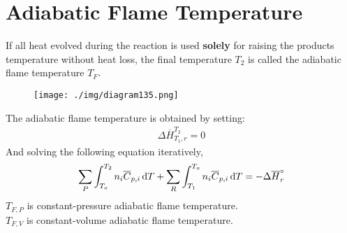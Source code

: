 \section{Adiabatic Flame Temperature}
If all heat evolved during the reaction is used \textbf{solely} for raising the products temperature without heat loss, the final temperature $T_2$ is called the adiabatic flame temperature $T_F$.
\begin{figure}[H]
  \centering
  \texttt{[image: ./img/diagram135.png]}
  \caption{}
\end{figure}
The adiabatic flame temperature is obtained by setting:
\begin{gather}
  \Delta \overline{H}_{T_1,r}^{T_2} = 0
\end{gather}
And solving the following equation iteratively,
\begin{gather}
  \sum_{P}\int_{T_o}^{T_2}n_i\overline{C}_{p,i}\dif T + \sum_{R}\int_{T_1}^{T_o}n_i\overline{C}_{p,i}\dif T = -\Delta\overline{H}_{r}^\circ
\end{gather}
$T_{F,P}$ is constant-pressure adiabatic flame temperature. \\
$T_{F,V}$ is constant-volume adiabatic flame temperature.
